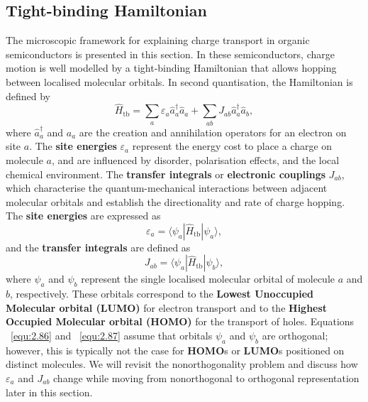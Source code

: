 \subsection{Tight-binding Hamiltonian} \label{sec:2.6.1}

The microscopic framework for explaining charge transport in organic semiconductors is presented in this section.
In these semiconductors, charge motion is well modelled by a tight-binding Hamiltonian that allows hopping between localised molecular orbitals. In second quantisation, the Hamiltonian is defined by \cite{Coropceanu2007, Pope1999, Silinsh1994OrganicMC}
\begin{equation} \label{equ:2.85}
    \hat{H}_{\text{tb}} = \sum_{a} \varepsilon_{a} \hat{a}^{\dagger}_{a}\hat{a}_{a} + \sum_{ab} J_{ab} \hat{a}^{\dagger}_{a}\hat{a}_{b},
\end{equation}
where $\hat{a}^{\dagger}_{a}$ and $a_{a}$ are the creation and annihilation operators for an electron on site $a$.
The \textbf{site energies} $\varepsilon_{a}$ represent the energy cost to place a charge on molecule $a$, and are influenced by disorder, polarisation effects, and the local chemical environment.
The \textbf{transfer integrals} or \textbf{electronic couplings} $J_{ab}$, which characterise the quantum-mechanical interactions between adjacent molecular orbitals and establish the directionality and rate of charge hopping.
The \textbf{site energies} are expressed as
\begin{equation} \label{equ:2.86}
    \varepsilon_{a} = \langle \psi_a | \hat{H}_{\text{tb}} | \psi_a \rangle,
\end{equation}
and the \textbf{transfer integrals} are defined as
\begin{equation} \label{equ:2.87}
    J_{ab} = \langle \psi_a | \hat{H}_{\text{tb}} | \psi_b \rangle,
\end{equation}
where $\psi_a$ and $\psi_b$ represent the single localised molecular orbital of molecule $a$ and $b$, respectively.
These orbitals correspond to the \textbf{Lowest Unoccupied Molecular orbital (LUMO)} for electron transport and to the \textbf{Highest Occupied Molecular orbital (HOMO)} for the transport of holes.
Equations ~\eqref{equ:2.86} and ~\eqref{equ:2.87} assume that orbitals $\psi_a$ and $\psi_b$ are orthogonal; however, this is typically not the case for \textbf{HOMO}s or \textbf{LUMO}s positioned on distinct molecules.
We will revisit the nonorthogonality problem and discuss how $\varepsilon_{a}$ and $J_{ab}$ change while moving from nonorthogonal to orthogonal representation later in this section.

